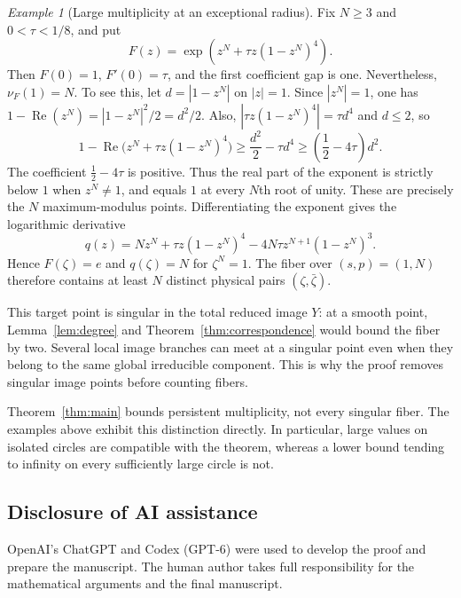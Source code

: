 \documentclass[11pt,reqno]{amsart}
\theoremstyle{remark}
\newtheorem{example}[theorem]{Example}
\numberwithin{equation}{section}
\DeclareMathOperator{\Rea}{Re}
\begin{document}
\begin{example}[Large multiplicity at an exceptional radius]\label{ex:exception}
Fix $N\ge3$ and $0<\tau<1/8$, and put
\[
 F(z)=\exp\!\left(z^N+\tau z(1-z^N)^4\right).
\]
Then $F(0)=1$, $F'(0)=\tau$, and the first coefficient gap is one.
Nevertheless, $\nu_F(1)=N$. To see this, let $d=|1-z^N|$ on $|z|=1$.
Since $|z^N|=1$, one has
$1-\Rea(z^N)=|1-z^N|^2/2=d^2/2$. Also,
$|\tau z(1-z^N)^4|=\tau d^4$ and $d\le2$, so
\[
 1-\Rea\bigl(z^N+\tau z(1-z^N)^4\bigr)
 \ge \frac{d^2}{2}-\tau d^4
 \ge\left(\frac12-4\tau\right)d^2.
\]
The coefficient $\frac12-4\tau$ is positive. Thus the real part
of the exponent is strictly below $1$ when $z^N\ne1$, and
equals $1$ at every $N$th root of unity. These are precisely
the $N$ maximum-modulus points. Differentiating the exponent
gives the logarithmic derivative
\[
 q(z)=Nz^N+\tau z(1-z^N)^4
             -4N\tau z^{N+1}(1-z^N)^3.
\]
Hence $F(\zeta)=e$ and $q(\zeta)=N$ for $\zeta^N=1$.
The fiber over $(s,p)=(1,N)$ therefore contains at least
$N$ distinct physical pairs $(\zeta,\bar\zeta)$.

This target point is singular in the total reduced image $Y$: at a
smooth point, Lemma~\ref{lem:degree} and
Theorem~\ref{thm:correspondence} would bound the fiber by two.
Several local image branches can meet at a singular point even when
they belong to the same global irreducible component. This is why
the proof removes singular image points before counting fibers.
\end{example}

Theorem~\ref{thm:main} bounds persistent multiplicity, not every
singular fiber. The examples above exhibit this distinction directly.
In particular, large values on isolated circles are compatible with
the theorem, whereas a lower bound tending to infinity on every
sufficiently large circle is not.

\subsection*{Disclosure of AI assistance}
OpenAI's ChatGPT and Codex (GPT-6) were used to develop the proof and
prepare the manuscript. The human author takes full responsibility for
the mathematical arguments and the final manuscript.
\end{document}
